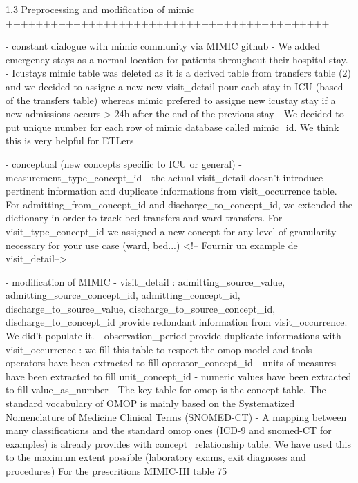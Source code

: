 1.3 Preprocessing and modification of mimic
+++++++++++++++++++++++++++++++++++++++++++

- constant dialogue with mimic community via MIMIC github
- We added emergency stays as a normal location for patients throughout their
  hospital stay.
- Icustays mimic table was deleted as it is a derived table from transfers
  table (2) and we decided to assigne a new new visit_detail pour each stay in
  ICU (based of the transfers table) whereas mimic prefered to assigne new
  icustay stay if a new admissions occurs > 24h after the end of the previous
  stay
- We decided to put unique number for each row of mimic database  called
  mimic_id. We think this is very helpful for ETLers


	- conceptual (new concepts specific to ICU or general)
		- measurement_type_concept_id
		- the actual visit_detail doesn't introduce pertinent information and duplicate informations from visit_occurrence table. For admitting_from_concept_id and discharge_to_concept_id, we extended the dictionary in order to track bed transfers and ward transfers. For visit_type_concept_id we assigned a new concept for any level of granularity necessary for your use case (ward, bed...) 
		<!-- Fournir un example de visit_detail-->

- modification of MIMIC
	- visit_detail : admitting_source_value, admitting_source_concept_id, admitting_concept_id, discharge_to_source_value, discharge_to_source_concept_id, discharge_to_concept_id provide redondant information from visit_occurrence. We did't populate it.
	- observation_period provide duplicate informations with visit_occurrence : we fill this table to respect the omop model and tools
	- operators have been extracted to fill operator_concept_id
	- units of measures have been extracted to fill unit_concept_id
	- numeric values have been extracted to fill value_as_number
- The key table for omop is the concept table. The standard vocabulary of OMOP is mainly based on the Systematized Nomenclature of Medicine Clinical Terms (SNOMED-CT)
- A mapping between many classifications and the standard omop ones (ICD-9 and snomed-CT for examples) is already provides with concept_relationship table. We have used this to the maximum extent possible (laboratory exams, exit diagnoses and procedures)
  For the prescritions MIMIC-III table 75%

